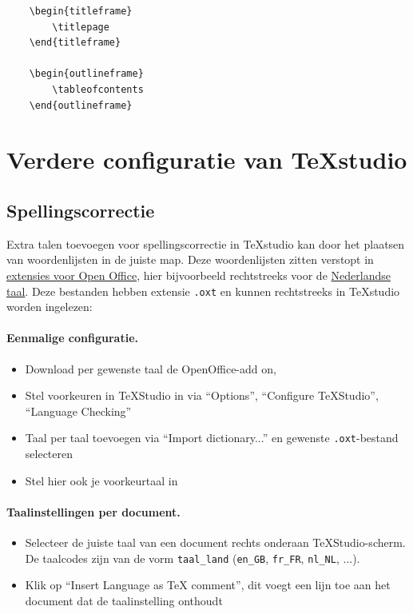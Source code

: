 \documentclass[kulak]{kulakarticle} %
\begin{document}
\begin{verbatim}
	\begin{titleframe}
		\titlepage
	\end{titleframe}
	
	\begin{outlineframe}
		\tableofcontents
	\end{outlineframe}
\end{verbatim}

\section{Verdere configuratie van TeXstudio}
\label{sec:texstudio}
\subsection{Spellingscorrectie}
Extra talen toevoegen voor spellingscorrectie in TeXstudio kan door het plaatsen van woordenlijsten in de juiste map. Deze woordenlijsten zitten verstopt in \href{http://extensions.openoffice.org/dictionaries}{extensies voor Open Office}, hier bijvoorbeeld rechtstreeks voor de \href{http://extensions.openoffice.org/en/project/dutch-spelling-and-hyphenation-dictionary}{Nederlandse taal}. Deze bestanden hebben extensie \texttt{.oxt} en kunnen rechtstreeks in TeXstudio worden ingelezen:

\paragraph{Eenmalige configuratie.}
\begin{itemize}
	\item Download per gewenste taal de OpenOffice-add on,
	\item Stel voorkeuren in TeXStudio in via ``Options'', ``Configure TeXStudio'', ``Language Checking''
	\item Taal per taal toevoegen via ``Import dictionary...'' en gewenste \texttt{.oxt}-bestand selecteren
	\item Stel hier ook je voorkeurtaal in
\end{itemize}

\paragraph{Taalinstellingen per document.}
\begin{itemize}
	\item Selecteer de juiste taal van een document rechts onderaan TeXStudio-scherm. De taalcodes zijn van de vorm \texttt{taal\_land} (\texttt{en\_GB}, \texttt{fr\_FR}, \texttt{nl\_NL}, ...).
	\item Klik op ``Insert Language as TeX comment'', dit voegt een lijn toe aan het document dat de taalinstelling onthoudt
\end{itemize}
\end{document}
